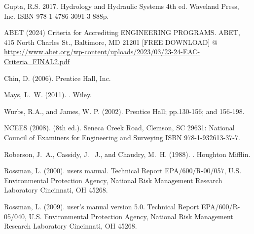 \documentclass[12pt]{article}
\begin{document}
\begin{thebibliography}{}
Gupta, R.S. 2017. Hydrology and Hydraulic Systems 4th ed. Waveland Press, Inc. ISBN 978-1-4786-3091-3 888p.

ABET (2024) Criteria for Accrediting ENGINEERING PROGRAMS. 
ABET, 415 North Charles St., Baltimore, MD 21201 
[FREE DOWNLOAD] @ \url{https://www.abet.org/wp-content/uploads/2023/03/23-24-EAC-Criteria_FINAL2.pdf}

Chin, D. (2006). 
\newblock Prentice Hall, Inc.

Mays, L.~W. (2011).
.
\newblock Wiley.

Wurbs, R.A., and James, W. P. (2002).
\newblock Prentice Hall; pp.130-156; and 156-198. 

NCEES (2008).
 (8th
  ed.).
 Seneca Creek Road, Clemson, SC 29631: National Council of
  Examiners for Engineering and Surveying {ISBN 978-1-932613-37-7}.

Roberson, J.~A., Cassidy, J. ~J., and Chaudry, M.~H.  (1988).
.
\newblock Houghton Mifflin.

Rossman, L. (2000).
 users manual.
\newblock Technical Report EPA/600/R-00/057, U.S. Environmental Protection
  Agency, National Risk Management Research Laboratory Cincinnati, OH 45268.
  
Rossman, L. (2009).
 user's manual version 5.0.
\newblock Technical Report EPA/600/R-05/040, U.S. Environmental Protection
  Agency, National Risk Management Research Laboratory Cincinnati, OH 45268.



\end{thebibliography}
\end{document}
